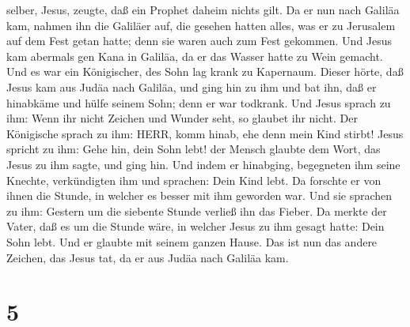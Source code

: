 selber, Jesus, zeugte, daß ein Prophet daheim nichts gilt. 
Da er nun nach Galiläa kam, nahmen ihn die Galiläer auf, die gesehen
hatten alles, was er zu Jerusalem auf dem Fest getan hatte; denn sie
waren auch zum Fest gekommen.  Und Jesus kam abermals gen
Kana in Galiläa, da er das Wasser hatte zu Wein gemacht. 
Und es war ein Königischer, des Sohn lag krank zu Kapernaum. Dieser
hörte, daß Jesus kam aus Judäa nach Galiläa, und ging hin zu ihm und bat
ihn, daß er hinabkäme und hülfe seinem Sohn; denn er war todkrank.
 Und Jesus sprach zu ihm: Wenn ihr nicht Zeichen und Wunder
seht, so glaubet ihr nicht.  Der Königische sprach zu ihm:
HERR, komm hinab, ehe denn mein Kind stirbt!  Jesus spricht
zu ihm: Gehe hin, dein Sohn lebt! der Mensch glaubte dem Wort, das Jesus
zu ihm sagte, und ging hin.  Und indem er hinabging,
begegneten ihm seine Knechte, verkündigten ihm und sprachen: Dein Kind
lebt.  Da forschte er von ihnen die Stunde, in welcher es
besser mit ihm geworden war. Und sie sprachen zu ihm: Gestern um die
siebente Stunde verließ ihn das Fieber.  Da merkte der
Vater, daß es um die Stunde wäre, in welcher Jesus zu ihm gesagt hatte:
Dein Sohn lebt. Und er glaubte mit seinem ganzen Hause. 
Das ist nun das andere Zeichen, das Jesus tat, da er aus Judäa nach
Galiläa kam.

\hypertarget{section-4}{%
\section{5}\label{section-4}}

